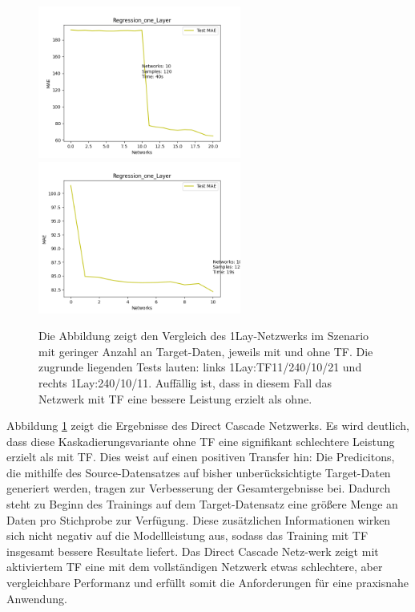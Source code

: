 \begin{figure}[htpb]
    \includegraphics[height=5cm]{../../Plots/ba_plots/regression_small/onelayer_ts.png}
    \includegraphics[height=5cm]{../../Plots/ba_plots/regression_small/woonelayer_ts.png}
    \caption{\label{fig:smallonl} 
    \small{Die Abbildung zeigt den Vergleich des 1Lay-Netzwerks im Szenario mit geringer Anzahl an Target-Daten, jeweils mit und ohne TF. Die 
    zugrunde liegenden Tests lauten: links 1Lay:TF11/240/10/21 und rechts 1Lay:240/10/11. Auffällig ist, dass in diesem Fall das Netzwerk mit 
    TF eine bessere Leistung erzielt als ohne.}}
\end{figure}

Abbildung \ref{fig:smallonl} zeigt die Ergebnisse des Direct Cascade Netzwerks. Es wird deutlich, dass diese Kaskadierungsvariante ohne TF eine 
signifikant schlechtere Leistung erzielt als mit TF. Dies weist auf einen positiven Transfer hin: Die Predicitons, die mithilfe des 
Source-Datensatzes auf bisher unberücksichtigte Target-Daten generiert werden, tragen zur Verbesserung der Gesamtergebnisse bei. Dadurch steht zu 
Beginn des Trainings auf dem Target-Datensatz eine größere Menge an Daten pro Stichprobe zur Verfügung. Diese zusätzlichen Informationen wirken 
sich nicht negativ auf die Modellleistung aus, sodass das Training mit TF insgesamt bessere Resultate liefert. 
Das Direct Cascade Netz-werk zeigt mit aktiviertem TF eine mit dem vollständigen Netzwerk etwas schlechtere, aber vergleichbare Performanz und 
erfüllt somit die Anforderungen für eine praxisnahe Anwendung.

